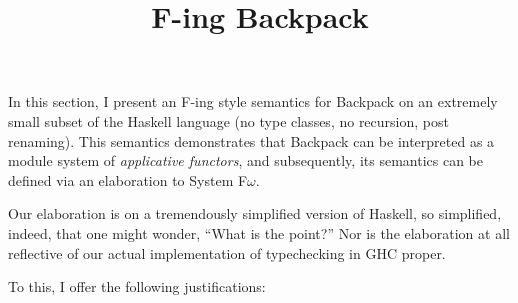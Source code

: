 \documentclass{article}
\begin{document}
\setlength{\pdfpageheight}{\paperheight}
\setlength{\pdfpagewidth}{\paperwidth}

\title{F-ing Backpack}

\maketitle

\noindent

In this section, I present an F-ing style semantics for Backpack on an
extremely small subset of the Haskell language (no type classes, no
recursion, post renaming).  This semantics demonstrates that Backpack
can be interpreted as a module system of \emph{applicative functors},
and subsequently, its semantics can be defined via an elaboration to
System F$\omega$.

Our elaboration is on a tremendously simplified version of Haskell,
so simplified, indeed, that one might wonder, ``What is the point?''
Nor is the elaboration at all reflective of our actual implementation
of typechecking in GHC proper.

To this, I offer the following justifications:
\end{document}
